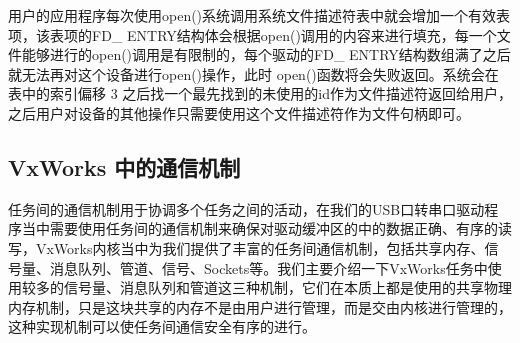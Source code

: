 用户的应用程序每次使用open()系统调用系统文件描述符表中就会增加一个有效表项，该表项的FD\_ ENTRY结构体会根据open()调用的内容来进行填充，每一个文件能够进行的open()调用是有限制的，每个驱动的FD\_ ENTRY结构数组满了之后就无法再对这个设备进行open()操作，此时 open()函数将会失败返回。系统会在表中的索引偏移 3 之后找一个最先找到的未使用的id作为文件描述符返回给用户，之后用户对设备的其他操作只需要使用这个文件描述符作为文件句柄即可。	
	
\subsection{VxWorks 中的通信机制}
	
	任务间的通信机制用于协调多个任务之间的活动，在我们的USB口转串口驱动程序当中需要使用任务间的通信机制来确保对驱动缓冲区的中的数据正确、有序的读写，VxWorks内核当中为我们提供了丰富的任务间通信机制，包括共享内存、信号量、消息队列、管道、信号、Sockets等。我们主要介绍一下VxWorks任务中使用较多的信号量、消息队列和管道这三种机制，它们在本质上都是使用的共享物理内存机制，只是这块共享的内存不是由用户进行管理，而是交由内核进行管理的，这种实现机制可以使任务间通信安全有序的进行\cite{胡明民2012基于实时操作系统}\cite{冯云贺2014基于}。

